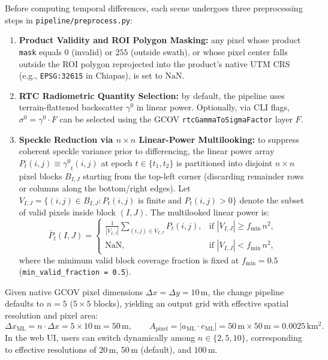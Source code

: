 \documentclass[11pt,a4paper]{article}
\newcommand{\src}[1]{\nolinkurl{#1}}
\newcommand{\unit}[1]{\mathrm{#1}}
\newcommand{\gz}{\ensuremath{\gamma^{0}}}
\newcommand{\sz}{\ensuremath{\sigma^{0}}}
\begin{document}
Before computing temporal differences, each scene undergoes three preprocessing steps in \src{pipeline/preprocess.py}:
\begin{enumerate}
  \item \textbf{Product Validity and ROI Polygon Masking:} any pixel whose product \texttt{mask} equals $0$ (invalid) or $255$ (outside swath), or whose pixel center falls outside the ROI polygon reprojected into the product's native UTM CRS (e.g., \texttt{EPSG:32615} in Chiapas), is set to $\mathrm{NaN}$.
  \item \textbf{RTC Radiometric Quantity Selection:} by default, the pipeline uses terrain-flattened backscatter $\gz$ in linear power. Optionally, via CLI flags, $\sz = \gz \cdot F$ can be selected using the GCOV \texttt{rtcGammaToSigmaFactor} layer $F$.
  \item \textbf{Speckle Reduction via $n\times n$ Linear-Power Multilooking:}
        to suppress coherent speckle variance prior to differencing, the linear power array $P_t(i,j) \equiv \gz_t(i,j)$ at epoch $t \in \{t_1, t_2\}$ is partitioned into disjoint $n\times n$ pixel blocks $B_{I,J}$ starting from the top-left corner (discarding remainder rows or columns along the bottom/right edges). Let $V_{I,J} = \{(i,j) \in B_{I,J} : P_t(i,j) \text{ is finite and } P_t(i,j) > 0\}$ denote the subset of valid pixels inside block $(I,J)$. The multilooked linear power is:
        \begin{equation}
          \bar{P}_t(I,J) =
          \begin{cases}
            \displaystyle\frac{1}{|V_{I,J}|} \sum_{(i,j)\in V_{I,J}} P_t(i,j), & \text{if } |V_{I,J}| \ge f_{\min}\,n^2, \\[10pt]
            \mathrm{NaN}, & \text{if } |V_{I,J}| < f_{\min}\,n^2,
          \end{cases}
          \label{eq:cambio-multilook-lineal}
        \end{equation}
        where the minimum valid block coverage fraction is fixed at $f_{\min} = 0.5$ (\texttt{min\_valid\_fraction = 0.5}).
\end{enumerate}

Given native GCOV pixel dimensions $\Delta x = \Delta y = 10\,\unit{m}$, the change pipeline defaults to $n = 5$ ($5\times 5$ blocks), yielding an output grid with effective spatial resolution and pixel area:
\begin{equation}
  \Delta x_{\mathrm{ML}} = n \cdot \Delta x = 5 \times 10\,\unit{m} = 50\,\unit{m}, \qquad
  A_{\mathrm{pixel}} = |a_{\mathrm{ML}} \cdot e_{\mathrm{ML}}| = 50\,\unit{m} \times 50\,\unit{m} = 0.0025\,\unit{km^2}.
  \label{eq:cambio-res-50m}
\end{equation}
In the web UI, users can switch dynamically among $n \in \{2, 5, 10\}$, corresponding to effective resolutions of $20\,\unit{m}$, $50\,\unit{m}$ (default), and $100\,\unit{m}$.
\end{document}

